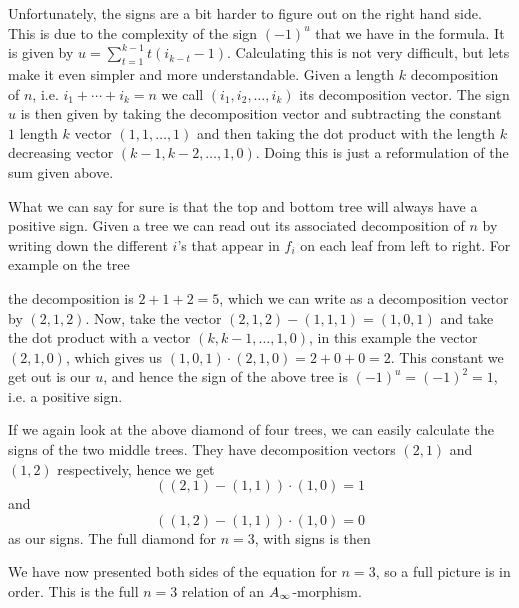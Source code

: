 Unfortunately, the signs are a bit harder to figure out on the right hand side. This is due to the complexity of the sign $(-1)^{u}$ that we have in the formula. It is given by $u = \displaystyle \sum_{t=1}^{k-1}t(i_{k-t}-1)$. Calculating this is not very difficult, but lets make it even simpler and more understandable. Given a length $k$ decomposition of $n$, i.e. $i_1+\cdots +i_k = n$ we call $(i_1, i_2, \ldots, i_k)$ its decomposition vector. The sign $u$ is then given by taking the decomposition vector and subtracting the constant $1$ length $k$ vector $(1,1,\ldots, 1)$ and then taking the dot product with the length $k$ decreasing vector $(k-1, k-2, \ldots, 1, 0)$. Doing this is just a reformulation of the sum given above. 


What we can say for sure is that the top and bottom tree will always have a positive sign. Given a tree we can read out its associated decomposition of $n$ by writing down the different $i$'s that appear in $f_i$ on each leaf from left to right. For example on the tree


the decomposition is $2+1+2=5$, which we can write as a decomposition vector by $(2,1,2)$. Now, take the vector $(2,1,2) - (1,1,1) = (1,0,1)$ and take the dot product with a vector $(k, k-1, \ldots, 1, 0)$, in this example the vector $(2,1,0)$, which gives us $(1,0,1)\cdot (2,1,0)= 2+0+0=2$. This constant we get out is our $u$, and hence the sign of the above tree is $(-1)^u = (-1)^2 = 1$, i.e. a positive sign. 

If we again look at the above diamond of four trees, we can easily calculate the signs of the two middle trees. They have decomposition vectors $(2,1)$ and $(1,2)$ respectively, hence we get
\begin{equation*}
    ((2,1)-(1,1))\cdot (1,0) = 1
\end{equation*}
and
\begin{equation*}
    ((1,2)-(1,1))\cdot (1,0) = 0
\end{equation*}
as our signs. The full diamond for $n=3$, with signs is then



We have now presented both sides of the equation for $n=3$, so a full picture is in order. This is the full $n=3$ relation of an $A_{\infty}$-morphism.


